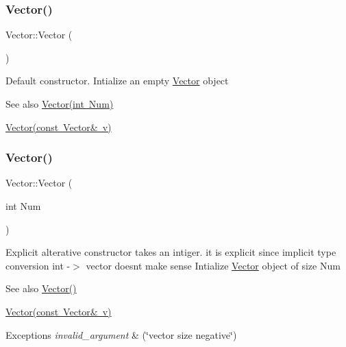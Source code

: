 \subsubsection{\texorpdfstring{Vector()}{Vector()}\hspace{0.1cm}{\footnotesize\ttfamily [1/3]}}
{\footnotesize\ttfamily Vector\+::\+Vector (\begin{DoxyParamCaption}{ }\end{DoxyParamCaption})}

Default constructor. Intialize an empty \mbox{\hyperlink{classVector}{Vector}} object \begin{DoxySeeAlso}{See also}
\mbox{\hyperlink{classVector_acbdf66550f2caa0a64e0b356fb63a277}{Vector(int Num)}} 

\mbox{\hyperlink{classVector_a5f04e343b7306ad11f8a82c89b486764}{Vector(const Vector\& v)}} 
\end{DoxySeeAlso}
\mbox{\label{classVector_acbdf66550f2caa0a64e0b356fb63a277}} 
\subsubsection{\texorpdfstring{Vector()}{Vector()}\hspace{0.1cm}{\footnotesize\ttfamily [2/3]}}
{\footnotesize\ttfamily Vector\+::\+Vector (\begin{DoxyParamCaption}\item[{int}]{Num }\end{DoxyParamCaption})\hspace{0.3cm}{\ttfamily [explicit]}}

Explicit alterative constructor takes an intiger. it is explicit since implicit type conversion int -\/$>$ vector doesn\textquotesingle{}t make sense Intialize \mbox{\hyperlink{classVector}{Vector}} object of size Num \begin{DoxySeeAlso}{See also}
\mbox{\hyperlink{classVector_a6f80c73b5f18dcf3f8e36065bdc8b9e5}{Vector()}} 

\mbox{\hyperlink{classVector_a5f04e343b7306ad11f8a82c89b486764}{Vector(const Vector\& v)}} 
\end{DoxySeeAlso}

\begin{DoxyExceptions}{Exceptions}
{\em invalid\+\_\+argument} & (\char`\"{}vector size negative\char`\"{}) \\
\hline
\end{DoxyExceptions}

